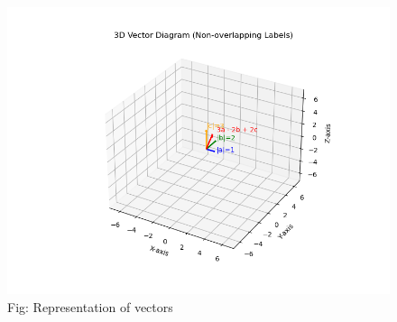 \documentclass[journal]{IEEEtran}
\begin{document}
\begin{figure}[h!]
  \centering
  \includegraphics[width=0.9\columnwidth]{figs/fig3.png} 
   \caption*{Fig: Representation of vectors}
  \label{Fig3}
\end{figure}
\end{document}
